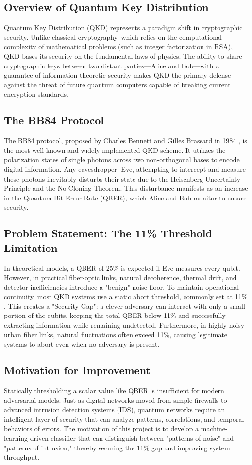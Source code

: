 \documentclass[journal,onecolumn,12pt,draftclsnofoot]{IEEEtran}
\begin{document}
\subsection{Overview of Quantum Key Distribution}
Quantum Key Distribution (QKD) represents a paradigm shift in cryptographic security. Unlike classical cryptography, which relies on the computational complexity of mathematical problems (such as integer factorization in RSA), QKD bases its security on the fundamental laws of physics. The ability to share cryptographic keys between two distant parties—Alice and Bob—with a guarantee of information-theoretic security makes QKD the primary defense against the threat of future quantum computers capable of breaking current encryption standards.

\subsection{The BB84 Protocol}
The BB84 protocol, proposed by Charles Bennett and Gilles Brassard in 1984 \cite{bb84}, is the most well-known and widely implemented QKD scheme. It utilizes the polarization states of single photons across two non-orthogonal bases to encode digital information. Any eavesdropper, Eve, attempting to intercept and measure these photons inevitably disturbs their state due to the Heisenberg Uncertainty Principle and the No-Cloning Theorem. This disturbance manifests as an increase in the Quantum Bit Error Rate (QBER), which Alice and Bob monitor to ensure security.

\subsection{Problem Statement: The 11\% Threshold Limitation}
In theoretical models, a QBER of 25\% is expected if Eve measures every qubit. However, in practical fiber-optic links, natural decoherence, thermal drift, and detector inefficiencies introduce a "benign" noise floor. To maintain operational continuity, most QKD systems use a static abort threshold, commonly set at 11\% \cite{sifted_error}. This creates a "Security Gap": a clever adversary can interact with only a small portion of the qubits, keeping the total QBER below 11\% and successfully extracting information while remaining undetected. Furthermore, in highly noisy urban fiber links, natural fluctuations often exceed 11\%, causing legitimate systems to abort even when no adversary is present.

\subsection{Motivation for Improvement}
Statically thresholding a scalar value like QBER is insufficient for modern adversarial models. Just as digital networks moved from simple firewalls to advanced intrusion detection systems (IDS), quantum networks require an intelligent layer of security that can analyze patterns, correlations, and temporal behaviors of errors. The motivation of this project is to develop a machine-learning-driven classifier that can distinguish between "patterns of noise" and "patterns of intrusion," thereby securing the 11\% gap and improving system throughput.
\end{document}
